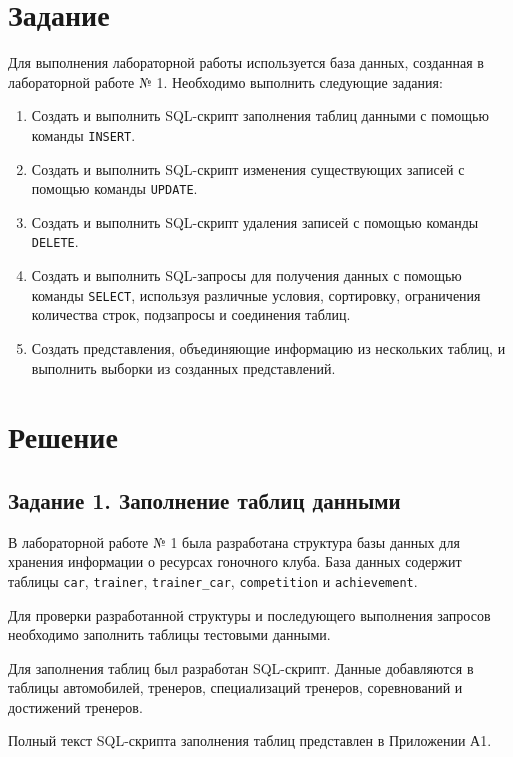 \documentclass[oneside,a4paper,14pt]{extarticle}
\begin{document}
\section{Задание}

Для выполнения лабораторной работы используется база данных, созданная в лабораторной работе № 1. Необходимо выполнить следующие задания:

\begin{enumerate}
    \item Создать и выполнить SQL-скрипт заполнения таблиц данными с помощью команды \texttt{INSERT}.
    \item Создать и выполнить SQL-скрипт изменения существующих записей с помощью команды \texttt{UPDATE}.
    \item Создать и выполнить SQL-скрипт удаления записей с помощью команды \texttt{DELETE}.
    \item Создать и выполнить SQL-запросы для получения данных с помощью команды \texttt{SELECT}, используя различные условия, сортировку, ограничения количества строк, подзапросы и соединения таблиц.
    \item Создать представления, объединяющие информацию из нескольких таблиц, и выполнить выборки из созданных представлений.
\end{enumerate}

\newpage
\section{Решение}

\subsection{Задание 1. Заполнение таблиц данными}

В лабораторной работе № 1 была разработана структура базы данных для хранения информации о ресурсах гоночного клуба. База данных содержит таблицы \texttt{car}, \texttt{trainer}, \texttt{trainer\_car}, \texttt{competition} и \texttt{achievement}.

Для проверки разработанной структуры и последующего выполнения запросов необходимо заполнить таблицы тестовыми данными.

Для заполнения таблиц был разработан SQL-скрипт. Данные добавляются в таблицы автомобилей, тренеров, специализаций тренеров, соревнований и достижений тренеров.

Полный текст SQL-скрипта заполнения таблиц представлен в Приложении А1.
\end{document}
